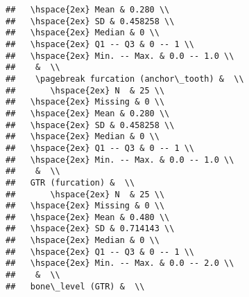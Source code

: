 \documentclass{article}\usepackage[]{graphicx}\usepackage[]{color}
\makeatletter
\newenvironment{kframe}{%
 \def\at@end@of@kframe{}%
 \ifinner\ifhmode%
  \def\at@end@of@kframe{\end{minipage}}%
  \begin{minipage}{\columnwidth}%
 \fi\fi%
 \def\FrameCommand##1{\hskip\@totalleftmargin \hskip-\fboxsep
 \colorbox{shadecolor}{##1}\hskip-\fboxsep
     \hskip-\linewidth \hskip-\@totalleftmargin \hskip\columnwidth}%
 \MakeFramed {\advance\hsize-\width
   \@totalleftmargin\z@ \linewidth\hsize
   \@setminipage}}%
 {\par\unskip\endMakeFramed%
 \at@end@of@kframe}
\newenvironment{knitrout}{}{} %
\makeatother
\begin{document}
\begin{knitrout}
\begin{kframe}
\begin{verbatim}
##   \hspace{2ex} Mean & 0.280 \\ 
##   \hspace{2ex} SD & 0.458258 \\ 
##   \hspace{2ex} Median & 0 \\ 
##   \hspace{2ex} Q1 -- Q3 & 0 -- 1 \\ 
##   \hspace{2ex} Min. -- Max. & 0.0 -- 1.0 \\ 
##    &  \\ 
##    \pagebreak furcation (anchor\_tooth) &  \\ 
##       \hspace{2ex} N  & 25 \\ 
##   \hspace{2ex} Missing & 0 \\ 
##   \hspace{2ex} Mean & 0.280 \\ 
##   \hspace{2ex} SD & 0.458258 \\ 
##   \hspace{2ex} Median & 0 \\ 
##   \hspace{2ex} Q1 -- Q3 & 0 -- 1 \\ 
##   \hspace{2ex} Min. -- Max. & 0.0 -- 1.0 \\ 
##    &  \\ 
##   GTR (furcation) &  \\ 
##       \hspace{2ex} N  & 25 \\ 
##   \hspace{2ex} Missing & 0 \\ 
##   \hspace{2ex} Mean & 0.480 \\ 
##   \hspace{2ex} SD & 0.714143 \\ 
##   \hspace{2ex} Median & 0 \\ 
##   \hspace{2ex} Q1 -- Q3 & 0 -- 1 \\ 
##   \hspace{2ex} Min. -- Max. & 0.0 -- 2.0 \\ 
##    &  \\ 
##   bone\_level (GTR) &  \\ 

\end{verbatim}
\end{kframe}
\end{knitrout}
\end{document}

